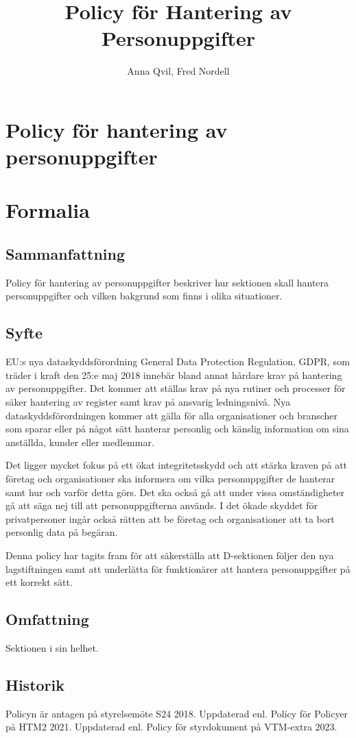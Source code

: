 \documentclass{dsekprotokoll}
\title{Policy för Hantering av Personuppgifter}
\author{Anna Qvil, Fred Nordell}
\begin{document}
\section*{Policy för hantering av personuppgifter}
\section{Formalia}
\subsection{Sammanfattning}
Policy för hantering av personuppgifter beskriver hur sektionen skall hantera personuppgifter och vilken bakgrund som finns i olika situationer.
\subsection{Syfte}
EU:s nya dataskyddsförordning General Data Protection Regulation, GDPR, som träder i kraft den 25:e maj 2018 innebär bland annat hårdare krav på hantering av personuppgifter. Det kommer att ställas krav på nya rutiner och processer för säker hantering av register samt krav på ansvarig ledningsnivå. Nya dataskyddsförordningen kommer att gälla för alla organisationer och branscher som sparar eller på något sätt hanterar personlig och känslig information om sina anställda, kunder eller medlemmar.

\par Det ligger mycket fokus på ett ökat integritetsskydd och att stärka kraven på att företag och organisationer ska informera om vilka personuppgifter de hanterar samt hur och varför detta görs. Det ska också gå att under vissa omständigheter gå att säga nej till att personuppgifterna används. I det ökade skyddet för privatpersoner ingår också rätten att be företag och organisationer att ta bort personlig data på begäran.

Denna policy har tagits fram för att säkerställa att D-sektionen följer den nya lagstiftningen samt att underlätta för funktionärer att hantera personuppgifter på ett korrekt sätt.
\subsection{Omfattning}
Sektionen i sin helhet.
\subsection{Historik}
Policyn är antagen på styrelsemöte S24 2018.
Uppdaterad enl. Policy för Policyer på HTM2 2021. Uppdaterad enl. Policy för styrdokument på VTM-extra 2023.
\end{document}
